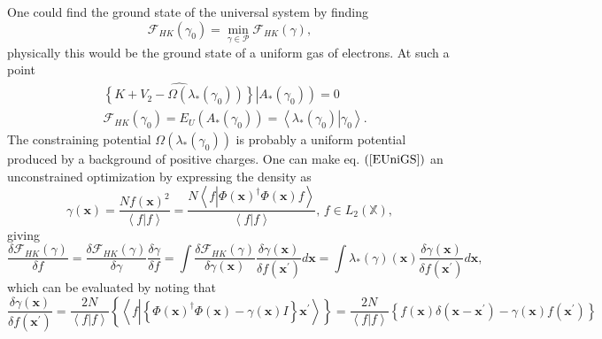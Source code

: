 \documentclass[aps,preprint]{revtex4}%
\begin{document}
One could find the ground state of the universal system by finding
\begin{equation}
\mathcal{F}_{HK}\left(  \gamma_{0}\right)  =\min_{\gamma\in\mathcal{P}%
}\mathcal{F}_{HK}\left(  \gamma\right)  , \label{EUniGS}%
\end{equation}
physically this would be the ground state of a uniform gas of electrons. At
such a point%
\begin{align}
&  \widehat{\left\{  K+V_{2}-\Omega\left(  \lambda_{\ast}\left(  \gamma
_{0}\right)  \right)  \right\}  }\left\vert A_{\ast}\left(  \gamma_{0}\right)
\right)  =0\nonumber\\
&  \mathcal{F}_{HK}\left(  \gamma_{0}\right)  =E_{U}\left(  A_{\ast}\left(
\gamma_{0}\right)  \right)  =\left\langle \left.  \lambda_{\ast}\left(
\gamma_{0}\right)  \right\vert \gamma_{0}\right\rangle .
\end{align}
The constraining potential $\Omega\left(  \lambda_{\ast}\left(  \gamma
_{0}\right)  \right)  $ is probably a uniform potential produced by a
background of positive charges. One can make eq. $\left(  \ref{EUniGS}\right)
$ an unconstrained optimization by expressing the density as
\begin{equation}
\gamma\left(  \mathbf{x}\right)  =\frac{Nf\left(  \mathbf{x}\right)  ^{2}%
}{\left\langle f|f\right\rangle }=\frac{N\left\langle f\left\vert \Phi\left(
\mathbf{x}\right)  ^{\dagger}\Phi\left(  \mathbf{x}\right)  f\right.
\right\rangle }{\left\langle f|f\right\rangle },\,f\in L_{2}\left(
\mathbb{X}\right)  ,
\end{equation}
giving%
\begin{equation}
\frac{\delta\mathcal{F}_{HK}\left(  \gamma\right)  }{\delta f}=\frac
{\delta\mathcal{F}_{HK}\left(  \gamma\right)  }{\delta\gamma}\frac
{\delta\gamma}{\delta f}=\int\frac{\delta\mathcal{F}_{HK}\left(
\gamma\right)  }{\delta\gamma\left(  \mathbf{x}\right)  }\frac{\delta
\gamma\left(  \mathbf{x}\right)  }{\delta f\left(  \mathbf{x}^{\prime}\right)
}d\mathbf{x}=\int\lambda_{\ast}\left(  \gamma\right)  \left(  \mathbf{x}%
\right)  \frac{\delta\gamma\left(  \mathbf{x}\right)  }{\delta f\left(
\mathbf{x}^{\prime}\right)  }d\mathbf{x,}%
\end{equation}
which can be evaluated by noting that%
\begin{equation}
\frac{\delta\gamma\left(  \mathbf{x}\right)  }{\delta f\left(  \mathbf{x}%
^{\prime}\right)  }=\frac{2N}{\left\langle f|f\right\rangle }\left\{
\left\langle f\left\vert \overset{}{\left\{  \Phi\left(  \mathbf{x}\right)
^{\dagger}\Phi\left(  \mathbf{x}\right)  -\gamma\left(  \mathbf{x}\right)
I\right\}  }\right.  \mathbf{x}^{\prime}\right\rangle \right\}  =\frac
{2N}{\left\langle f|f\right\rangle }\left\{  f\left(  \mathbf{x}\right)
\delta\left(  \mathbf{x-x}^{\prime}\right)  -\gamma\left(  \mathbf{x}\right)
f\left(  \mathbf{x}^{\prime}\right)  \right\}
\end{equation}
\end{document}
